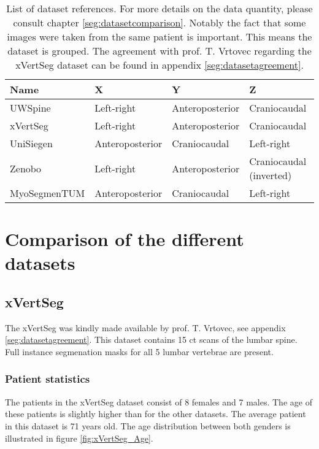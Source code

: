 \begin{SCtable}[\sidecaptionrelwidth][h]
 
    \begin{tabular}{ l l l l} 
     \hline
     \hline
     Name & X & Y & Z \\
     \hline 
    UWSpine & Left-right & Anteroposterior & Craniocaudal \\
    xVertSeg & Left-right & Anteroposterior & Craniocaudal \\
    UniSiegen  &  Anteroposterior & Craniocaudal & Left-right \\
    Zenobo & Left-right & Anteroposterior & Craniocaudal (inverted) \\
    MyoSegmenTUM &  Anteroposterior & Craniocaudal & Left-right \\
     \hline
     \hline
    \end{tabular}
    \caption{List of dataset references. For more details on the data quantity, please consult chapter \ref{seg:datasetcomparison}. 
    Notably the fact that some images were taken from the same patient is important. This means the dataset is grouped. 
    The agreement with prof. T. Vrtovec regarding the xVertSeg dataset can be found in appendix \ref{seg:datasetagreement}.}

\end{SCtable}

\section{Comparison of the different datasets\label{seg:datasetcomparison}}

\subsection{xVertSeg}

The xVertSeg \cite{Ibragimov2012,Ibragimov2012} was kindly made available by prof. T. Vrtovec, see appendix \ref{seg:datasetagreement}.
This dataset contains 15 \acrshort{ct} scans of the lumbar spine. 
Full instance segmenation masks for all 5 lumbar vertebrae are present.


\subsubsection{Patient statistics}

The patients in the xVertSeg dataset consist of 8 females and 7 males.
The age of these patients is slightly higher than for the other datasets.
The average patient in this dataset is 71 years old.
The age distribution between both genders is illustrated in figure \ref{fig:xVertSeg_Age}. 


